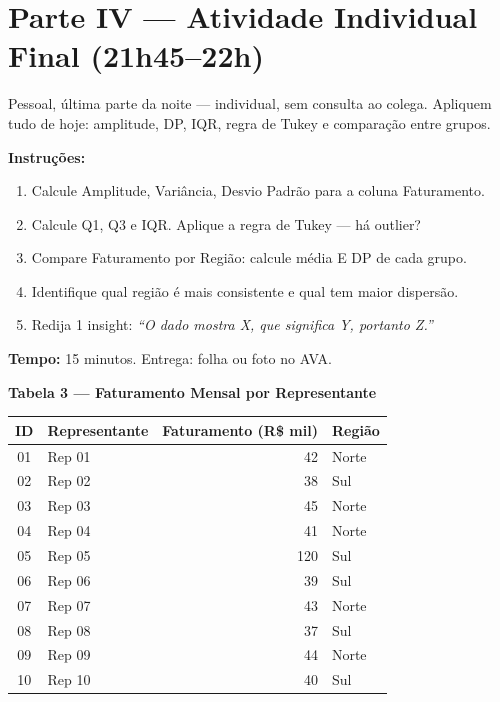 \section{Parte IV — Atividade Individual Final (21h45–22h)}

Pessoal, última parte da noite — individual, sem consulta ao colega.
Apliquem tudo de hoje: amplitude, DP, IQR, regra de Tukey e comparação entre grupos.

\begin{SolvedBox}
\textbf{Instruções:}
\begin{enumerate}
  \item Calcule Amplitude, Variância, Desvio Padrão para a coluna Faturamento.
  \item Calcule Q1, Q3 e IQR. Aplique a regra de Tukey — há outlier?
  \item Compare Faturamento por Região: calcule média E DP de cada grupo.
  \item Identifique qual região é mais consistente e qual tem maior dispersão.
  \item Redija 1 insight: \emph{``O dado mostra X, que significa Y, portanto Z.''
}\end{enumerate}
\textbf{Tempo:} 15 minutos. Entrega: folha ou foto no AVA.
\end{SolvedBox}

\begin{BoardBox}
\textbf{Tabela 3 — Faturamento Mensal por Representante}

\medskip
\begin{tabular}{|c|l|r|l|}
\hline
\textbf{ID} & \textbf{Representante} & \textbf{Faturamento (R\$ mil)} & \textbf{Região} \\
\hline
01 & Rep 01 & 42 & Norte \\
02 & Rep 02 & 38 & Sul   \\
03 & Rep 03 & 45 & Norte \\
04 & Rep 04 & 41 & Norte \\
05 & Rep 05 & 120 & Sul  \\
06 & Rep 06 & 39 & Sul   \\
07 & Rep 07 & 43 & Norte \\
08 & Rep 08 & 37 & Sul   \\
09 & Rep 09 & 44 & Norte \\
10 & Rep 10 & 40 & Sul   \\
\hline
\end{tabular}
\end{BoardBox}

